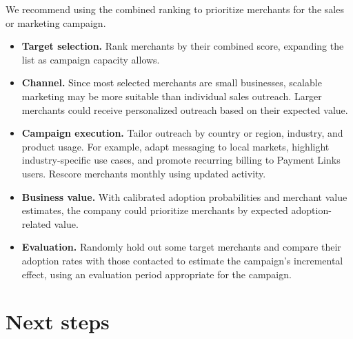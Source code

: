 \documentclass[11pt]{article}
\begin{document}
We recommend using the combined ranking to prioritize merchants for the sales or marketing campaign.
\begin{itemize}
    \item \textbf{Target selection.}
    Rank merchants by their combined score, expanding the list as campaign capacity allows.

    \item \textbf{Channel.}
    Since most selected merchants are small businesses, scalable marketing may be more suitable than individual sales outreach.
    Larger merchants could receive personalized outreach based on their expected value.

    \item \textbf{Campaign execution.}
    Tailor outreach by country or region, industry, and product usage.
    For example, adapt messaging to local markets, highlight industry-specific use cases, and promote recurring billing to Payment Links users.
    Rescore merchants monthly using updated activity.

    \item \textbf{Business value.}
    With calibrated adoption probabilities and merchant value estimates, the company could prioritize merchants by expected adoption-related value.

    \item \textbf{Evaluation.}
    Randomly hold out some target merchants and compare their adoption rates with those contacted to estimate the campaign's incremental effect, using an evaluation period appropriate for the campaign.
\end{itemize}

\section{Next steps}\label{sec:next}
\end{document}
